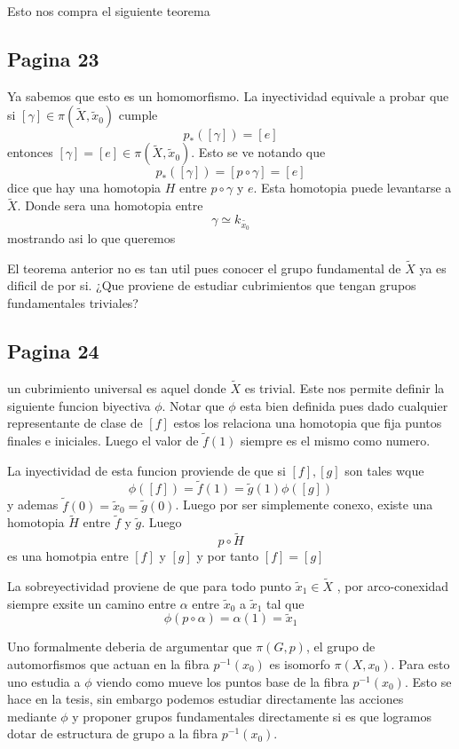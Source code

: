 \documentclass[letterpaper]{article}
\begin{document}
Esto nos compra el siguiente teorema

\subsection*{Pagina 23}
Ya sabemos que esto es un homomorfismo. La inyectividad equivale a
probar que si \([\gamma] \in \pi (\tilde X, \tilde x_0)\) cumple
\[ p_* ([\gamma]) = [e]\]
entonces \([\gamma] = [e] \in \pi (\tilde X, \tilde x_0)\). Esto se ve
notando que
\[ p_* ([\gamma]) = [p \circ \gamma] = [e]\]
dice que hay una homotopia \(H\) entre \(p \circ \gamma\) y \(e\). Esta
homotopia puede levantarse a \(\tilde X\). Donde sera una homotopia
entre
\[ \gamma \simeq k_{\tilde {x_0}} \]
mostrando asi lo que queremos

El teorema anterior no es tan util pues conocer el grupo fundamental de
\(\tilde X\) ya es dificil de por si. ¿Que proviene de estudiar
cubrimientos que tengan grupos fundamentales triviales?

\subsection*{Pagina 24}
un cubrimiento universal es aquel donde \(\tilde X\) es trivial. Este
nos permite definir la siguiente funcion biyectiva \(\phi\). Notar que
\(\phi\) esta bien definida pues dado cualquier representante de clase
de \([f]\) estos los relaciona una homotopia que fija puntos finales e
iniciales. Luego el valor de \(\tilde f (1)\) siempre es el mismo como
numero.

La inyectividad de esta funcion proviende de que si \([f] , [g]\) son
tales wque
\[ \phi ([f]) = \tilde f (1) = \tilde g (1) \phi ([g]) \]
y ademas \(\tilde f (0) = \tilde x_0 = \tilde g (0)\). Luego por ser
simplemente conexo, existe una homotopia \(\tilde H\) entre \(\tilde f\)
y \(\tilde g\). Luego
\[ p \circ \tilde H \]
es una homotpia entre \([f]\) y \([g]\) y por tanto \([f] = [g] \)

La sobreyectividad proviene de que para todo punto \(\tilde x_1 \in
\tilde X\) , por arco-conexidad siempre exsite un camino entre
\(\alpha\) entre \(\tilde x_0\) a \(\tilde x_1\) tal que
\[ \phi (p \circ \alpha) = \alpha (1) = \tilde x_1\]

Uno formalmente deberia de argumentar que \(\pi (G,p)\), el grupo de
automorfismos que actuan en la fibra \(p^{-1} (x_0)\) es isomorfo \(\pi
(X, x_0)\). Para esto uno estudia a \(\phi\) viendo como mueve los
puntos base de la fibra \(p^{-1} (x_0)\). Esto se hace en la tesis, sin
embargo podemos estudiar directamente las acciones mediante \(\phi\) y
proponer grupos fundamentales directamente si es que logramos dotar de
estructura de grupo a la fibra \(p^{-1} (x_0)\).
\end{document}
